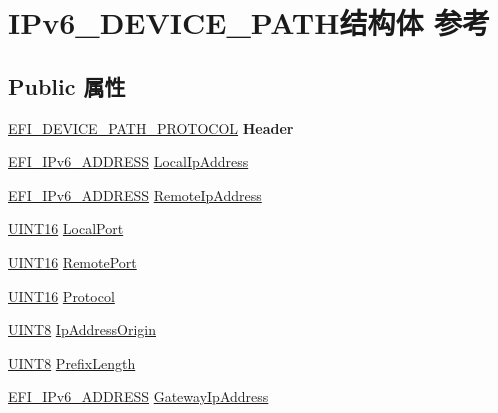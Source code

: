 \hypertarget{struct_i_pv6___d_e_v_i_c_e___p_a_t_h}{}\section{I\+Pv6\+\_\+\+D\+E\+V\+I\+C\+E\+\_\+\+P\+A\+T\+H结构体 参考}
\label{struct_i_pv6___d_e_v_i_c_e___p_a_t_h}
\subsection*{Public 属性}
\begin{DoxyCompactItemize}
\item 
\mbox{\label{struct_i_pv6___d_e_v_i_c_e___p_a_t_h_a568c31b643d849e704a866859970363d}} 
\hyperlink{struct_e_f_i___d_e_v_i_c_e___p_a_t_h___p_r_o_t_o_c_o_l}{E\+F\+I\+\_\+\+D\+E\+V\+I\+C\+E\+\_\+\+P\+A\+T\+H\+\_\+\+P\+R\+O\+T\+O\+C\+OL} {\bfseries Header}
\item 
\hyperlink{struct_e_f_i___i_pv6___a_d_d_r_e_s_s}{E\+F\+I\+\_\+\+I\+Pv6\+\_\+\+A\+D\+D\+R\+E\+SS} \hyperlink{struct_i_pv6___d_e_v_i_c_e___p_a_t_h_a56bf82963968ae88c9a7d80d9ad4d702}{Local\+Ip\+Address}
\item 
\hyperlink{struct_e_f_i___i_pv6___a_d_d_r_e_s_s}{E\+F\+I\+\_\+\+I\+Pv6\+\_\+\+A\+D\+D\+R\+E\+SS} \hyperlink{struct_i_pv6___d_e_v_i_c_e___p_a_t_h_acc51a89b32c647798bef772914626f27}{Remote\+Ip\+Address}
\item 
\hyperlink{_processor_bind_8h_a09f1a1fb2293e33483cc8d44aefb1eb1}{U\+I\+N\+T16} \hyperlink{struct_i_pv6___d_e_v_i_c_e___p_a_t_h_ad5a366e8f1e520eff8ae8abf8d0813e9}{Local\+Port}
\item 
\hyperlink{_processor_bind_8h_a09f1a1fb2293e33483cc8d44aefb1eb1}{U\+I\+N\+T16} \hyperlink{struct_i_pv6___d_e_v_i_c_e___p_a_t_h_a9e468362588a0c2cf78f97f136fefe82}{Remote\+Port}
\item 
\hyperlink{_processor_bind_8h_a09f1a1fb2293e33483cc8d44aefb1eb1}{U\+I\+N\+T16} \hyperlink{struct_i_pv6___d_e_v_i_c_e___p_a_t_h_a318b901397540707a701841c52dc5818}{Protocol}
\item 
\hyperlink{_processor_bind_8h_ab27e9918b538ce9d8ca692479b375b6a}{U\+I\+N\+T8} \hyperlink{struct_i_pv6___d_e_v_i_c_e___p_a_t_h_a842df8e9d5b5b35a11c8b50eceff5421}{Ip\+Address\+Origin}
\item 
\hyperlink{_processor_bind_8h_ab27e9918b538ce9d8ca692479b375b6a}{U\+I\+N\+T8} \hyperlink{struct_i_pv6___d_e_v_i_c_e___p_a_t_h_aefb191ac3d6697a2276bd18510f5fb0e}{Prefix\+Length}
\item 
\hyperlink{struct_e_f_i___i_pv6___a_d_d_r_e_s_s}{E\+F\+I\+\_\+\+I\+Pv6\+\_\+\+A\+D\+D\+R\+E\+SS} \hyperlink{struct_i_pv6___d_e_v_i_c_e___p_a_t_h_afb4de155c59a7562200fa7c25cf4683f}{Gateway\+Ip\+Address}
\end{DoxyCompactItemize}


